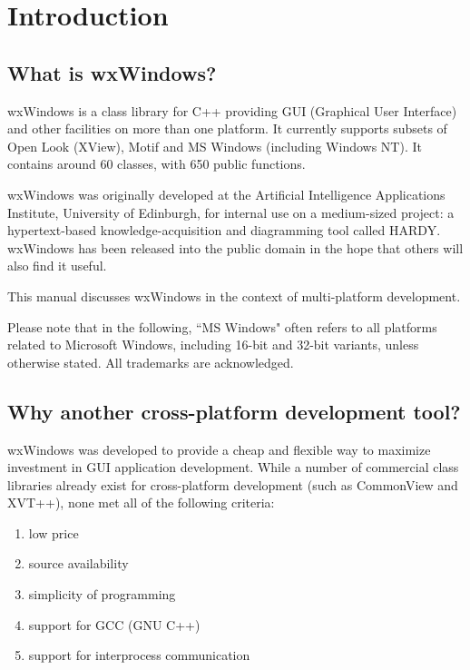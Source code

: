 \chapter{Introduction}\label{introduction}
%
%
\setfooter{\thepage}{}{}{}{}{\thepage}%

\section{What is wxWindows?}

wxWindows is a class library for C++ providing GUI (Graphical User
Interface) and other facilities on more than one platform.  It currently
supports subsets of Open Look (XView), Motif and MS Windows (including
Windows NT).  It contains around 60 classes, with 650 public functions.

wxWindows was originally developed at the Artificial Intelligence
Applications Institute, University of Edinburgh, for internal use on a
medium-sized project: a hypertext-based knowledge-acquisition
and diagramming tool called HARDY. wxWindows has been released into
the public domain in the hope that others will also find it useful.

This manual discusses wxWindows in the context of multi-platform
development.

Please note that in the following, ``MS Windows" often refers to all
platforms related to Microsoft Windows, including 16-bit and 32-bit
variants, unless otherwise stated. All trademarks are acknowledged.

\section{Why another cross-platform development tool?}

wxWindows was developed to provide a cheap and flexible way to maximize
investment in GUI application development.  While a number of commercial
class libraries already exist for cross-platform development (such as
CommonView and XVT++), none met all of the following criteria:

\begin{enumerate}\itemsep=0pt
\item low price
\item source availability
\item simplicity of programming
\item support for GCC (GNU C++)
\item support for interprocess communication
\end{enumerate}

